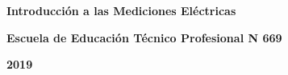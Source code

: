 \thispagestyle{empty}


\vspace*{\fill}

\begin{center}
\textbf{\color{verde_UnB}\fontsize{38pt}{45.6pt}\selectfont \textbf{Introducción a las Mediciones Eléctricas}}
\end{center}

\vspace{4 em}
\begin{center}
	\textbf{\color{verde_UnB}\fontsize{18pt}{20pt}\selectfont
	\textbf{Escuela de Educación Técnico Profesional N 669}}
\end{center}
\vfill

\begin{center}
	\textbf{2019}
\end{center}
\vspace*{\fill}

\clearpage